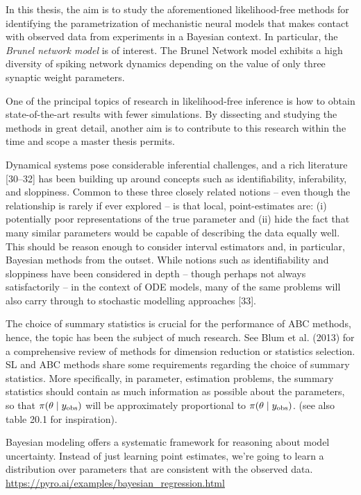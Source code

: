 In this thesis, the aim is to study the aforementioned likelihood-free methods for identifying the parametrization of mechanistic neural models that makes contact with observed data from experiments in a Bayesian context. In particular, the \textit{Brunel network model} is of interest. The Brunel Network model exhibits a high diversity of spiking network dynamics depending on the value of only three synaptic weight parameters.

One of the principal topics of research in likelihood-free inference is how to obtain state-of-the-art results with fewer simulations. By dissecting and studying the methods in great detail, another aim is to contribute to this research within the time and scope a master thesis permits. 

Dynamical systems pose considerable inferential challenges, and a rich literature [30–32] has been building up around concepts such as identifiability, inferability, and sloppiness. Common to these three closely related notions – even though the relationship is rarely if ever explored – is that local, point-estimates are: (i) potentially poor representations of the true parameter and (ii) hide the fact that many similar parameters would be capable of describing the data equally well. This should be reason enough to consider interval estimators and, in particular, Bayesian methods from the outset. While notions such as identifiability and sloppiness have been considered in depth – though perhaps not always satisfactorily – in the context of ODE models, many of the same problems will also carry through to stochastic modelling approaches [33]. \cite{ABC_ch17} 

The choice of summary statistics is crucial for the performance of ABC methods, hence, the topic has been the subject of much research. See Blum et al. (2013) for a comprehensive review of methods for dimension reduction or statistics selection. SL and ABC methods share some requirements regarding the choice of summary statistics. More specifically, in parameter, estimation problems, the summary statistics should contain as much information as possible about the parameters, so that $\pi \qty(\theta \mid y_\mathrm{obs})$ will be approximately proportional to $\pi \qty(\theta \mid y_\mathrm{obs})$. \cite{ABC_ch20} (see also table 20.1 for inspiration).

Bayesian modeling offers a systematic framework for reasoning about model uncertainty. Instead of just learning point estimates, we’re going to learn a distribution over parameters that are consistent with the observed data. \url{https://pyro.ai/examples/bayesian_regression.html}


